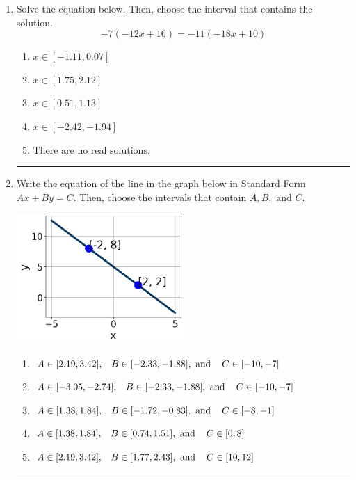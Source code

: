 \documentclass[14pt]{extbook}
\newcommand{\litem}[1]{\item#1\hspace*{-1cm}\rule{\textwidth}{0.4pt}}
\begin{document}
\begin{enumerate}
{\begin{enumerate}[label=\Alph*.]
\end{enumerate} }
\litem{
Solve the equation below. Then, choose the interval that contains the solution.\[ -7(-12x + 16) = -11(-18x + 10) \]\begin{enumerate}[label=\Alph*.]
\item \( x \in [-1.11, 0.07] \)
\item \( x \in [1.75, 2.12] \)
\item \( x \in [0.51, 1.13] \)
\item \( x \in [-2.42, -1.94] \)
\item \( \text{There are no real solutions.} \)

\end{enumerate} }
\litem{
Write the equation of the line in the graph below in Standard Form $Ax+By=C$. Then, choose the intervals that contain $A, B, \text{ and } C$.
\begin{center}
    \includegraphics[width=0.5\textwidth]{../Figures/linearGraphToStandardCopyC.png}
\end{center}
\begin{enumerate}[label=\Alph*.]
\item \( A \in [2.19, 3.42], \hspace{3mm} B \in [-2.33, -1.88], \text{ and } \hspace{3mm} C \in [-10, -7] \)
\item \( A \in [-3.05, -2.74], \hspace{3mm} B \in [-2.33, -1.88], \text{ and } \hspace{3mm} C \in [-10, -7] \)
\item \( A \in [1.38, 1.84], \hspace{3mm} B \in [-1.72, -0.83], \text{ and } \hspace{3mm} C \in [-8, -1] \)
\item \( A \in [1.38, 1.84], \hspace{3mm} B \in [0.74, 1.51], \text{ and } \hspace{3mm} C \in [0, 8] \)
\item \( A \in [2.19, 3.42], \hspace{3mm} B \in [1.77, 2.43], \text{ and } \hspace{3mm} C \in [10, 12] \)


\end{enumerate}}
\end{enumerate}
\end{document}
